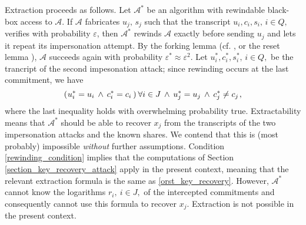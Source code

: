 \documentclass[10pt, psamsfonts, reqno]{amsart}
\theoremstyle{definition}
\theoremstyle{remark}
\numberwithin{equation}{section}
\begin{document}
Extraction proceeds as follows.
Let $\mathcal{A}^*$ be an algorithm with rewindable
black-box access to $\mathcal{A}$.
If $\mathcal{A}$ fabricates
$u_j,\hspace{2pt} s_j$ such that
the transcript $u_i, c_i, s_i,\hspace{2pt} i \in Q,$
verifies with probability $\varepsilon$,
then $\mathcal{A}^*$ rewinds $\mathcal{A}$
exactly before sending $u_j$ and
lets it repeat its impersonation attempt.
By the forking lemma
(cf. \cite{paper_bellare_musig},
or the reset lemma \cite{paper_bellare_palacio}),
$\mathcal{A}$ succeeds again with probability
$\varepsilon^* \approx \varepsilon ^ 2$.
Let $u_i^*, c_i^*, s_i^*,\hspace{2pt}i \in Q,$ be the
trancript of the second impesonation attack;
since rewinding occurs at the last commitment, we have
\vspace{3pt}
\begin{equation}\label{rewinding_condition}
(
	\hspace{0.5pt}
	u_i^* = u_i
	\hspace{2pt}
	\land
	\hspace{2pt}
	c_i^* = c_i
	\hspace{2pt}
)\hspace{2pt}\forall i \in J
\hspace{2pt}
\land
\hspace{2pt}
u_j^* = u_j
\hspace{2pt}
\land
\hspace{2pt}
c_j^* \neq c_j\hspace{1pt},
\vspace{3pt}
\end{equation}
where the last inequality holds with overwhelming probability true.
Extractability means that
$\mathcal{A}^*$ should be able to recover $x_j$
from the transcripts of the two
impersonation attacks and the known shares.
We contend that this is (most probably) impossible
\textit{without} further assumptions.
Condition \eqref{rewinding_condition} implies that the
computations of Section \ref{section_key_recovery_attack}
apply in the present context,
meaning that the relevant extraction
formula is the same as \eqref{orst_key_recovery}.
However, $\mathcal{A}^*$
cannot know the logarithms $r_i,\ i \in J,$
of the intercepted commitments
and consequently cannot use
this formula to recover $x_j$.
Extraction is not possible in the present context.
\end{document}
